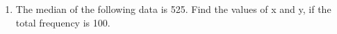\renewcommand{\theequation}{\theenumi}
\begin{enumerate}[label=\arabic*.,ref=\thesubsection.\theenumi]
\item The median of the following data is 525. Find the values of x and y, if the
total frequency is 100.
\begin{table}[!ht]
	\centering
	
\end{table}
\end{enumerate}

